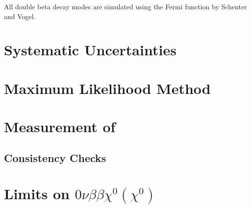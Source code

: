 \documentclass[herrin-thesis.tex]{subfiles}
\begin{document}
All double beta decay modes are simulated using the Fermi function by Schenter and Vogel\cite{Schenter:1983uq}.

\section{Systematic Uncertainties}

\section{Maximum Likelihood Method}

\section{Measurement of \twonu}

\subsection{Consistency Checks}

\section{Limits on \(0\nu\beta\beta\chi^0(\chi^0)\)}
\end{document}
